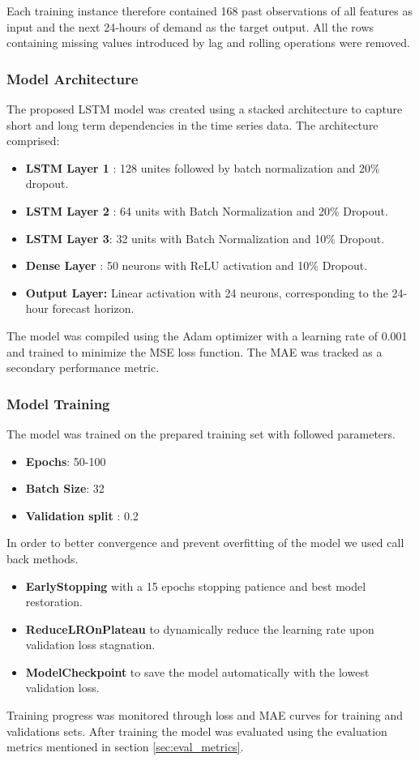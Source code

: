  Each training instance therefore contained 168 past observations of all features as input and the next 24-hours of demand as the target output. All the rows containing missing values introduced by lag and rolling operations were removed.
 
 \subsubsection{Model Architecture}
 
 The proposed LSTM model was created using a stacked architecture to capture short and long term dependencies in the time series data. The architecture comprised: 
 \begin{itemize}
 	\item \textbf{LSTM Layer 1} : 128 unites followed by batch normalization and 20\% dropout.
 	\item \textbf{LSTM Layer 2} : 64 units with Batch Normalization and 20\% Dropout.
 	
 	\item\textbf{ LSTM Layer 3}: 32 units with Batch Normalization and 10\% Dropout.
 	
 	\item \textbf{Dense Layer }: 50 neurons with ReLU activation and 10\% Dropout.
 	
   \item\textbf{ Output Layer:} Linear activation with 24 neurons, corresponding to the 24-hour forecast horizon.
 \end{itemize}
 
 
 The model was compiled using the Adam optimizer with a learning rate of 0.001 and trained to minimize the MSE loss function. The MAE was tracked as a secondary performance metric.
 
 \subsubsection{Model Training}The model was trained on the prepared training set with followed parameters.
 \begin{itemize}
 	\item \textbf{Epochs}:  50-100
 	\item \textbf{Batch Size}:  32
 	\item\textbf{ Validation split} : 0.2
 	\end{itemize}
 	
 	In order to better convergence and prevent overfitting of the model we used call back methods. 
 	\begin{itemize}
 		\item \textbf{EarlyStopping} with a  15 epochs stopping patience and best model restoration.
 		\item \textbf{ReduceLROnPlateau} to dynamically reduce the learning rate upon validation loss stagnation.
 		\item \textbf{ModelCheckpoint} to save the model automatically with the lowest validation loss.
 	\end{itemize}
 	Training progress was monitored through loss and MAE curves for training and validations sets. After training the model was evaluated using the evaluation metrics mentioned in section \ref{sec:eval_metrics}.
 	
